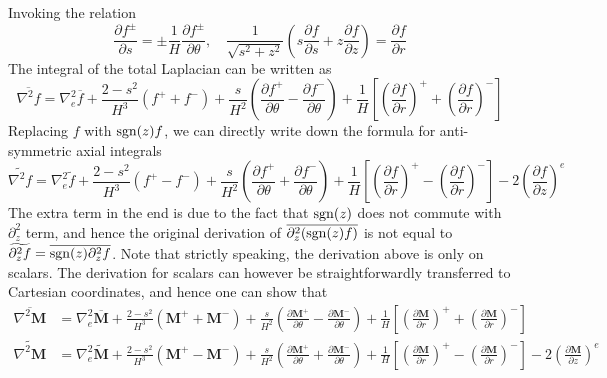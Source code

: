 Invoking the relation
\[
    \frac{\partial f^\pm}{\partial s} = \pm \frac{1}{H} \frac{\partial f^\pm}{\partial \theta},\quad 
    \frac{1}{\sqrt{s^2 + z^2}} \left(s \frac{\partial f}{\partial s} + z \frac{\partial f}{\partial z}\right) = \frac{\partial f}{\partial r}
\]
The integral of the total Laplacian can be written as
\begin{equation}
    \overline{\nabla^2 f} = \nabla_e^2 \overline{f} + \frac{2 - s^2}{H^3} \left(f^+ + f^-\right) + \frac{s}{H^2} \left(\frac{\partial f^+}{\partial \theta} - \frac{\partial f^-}{\partial \theta}\right) + \frac{1}{H} \left[\left(\frac{\partial f}{\partial r}\right)^+ + \left(\frac{\partial f}{\partial r}\right)^-\right]
\end{equation}
Replacing $f$ with $\operatorname{sgn}(z) f$, we can directly write down the formula for anti-symmetric axial integrals
\begin{equation}
    \widetilde{\nabla^2 f} = \nabla_e^2 \widetilde{f} + \frac{2 - s^2}{H^3} \left(f^+ - f^-\right) + \frac{s}{H^2} \left(\frac{\partial f^+}{\partial \theta} + \frac{\partial f^-}{\partial \theta}\right) + \frac{1}{H} \left[\left(\frac{\partial f}{\partial r}\right)^+ - \left(\frac{\partial f}{\partial r}\right)^-\right] - 2 \left(\frac{\partial f}{\partial z}\right)^e
\end{equation}
The extra term in the end is due to the fact that $\operatorname{sgn}(z)$ does not commute with $\partial_z^2$ term, and hence the original derivation of $\overline{\partial_z^2 (\operatorname{sgn}(z) f)}$ is not equal to $\widetilde{\partial_z^2 f} = \overline{\operatorname{sgn}(z) \partial_z^2 f}$. 
Note that strictly speaking, the derivation above is only on scalars. The derivation for scalars can however be straightforwardly transferred to Cartesian coordinates, and hence one can show that
\begin{equation}
\begin{aligned}
    \overline{\nabla^2 \mathbf{M}} &= \nabla_e^2 \overline{\mathbf{M}} + \frac{2 - s^2}{H^3} \left(\mathbf{M}^+ + \mathbf{M}^-\right) + \frac{s}{H^2} \left(\frac{\partial \mathbf{M}^+}{\partial \theta} - \frac{\partial \mathbf{M}^-}{\partial \theta}\right) + \frac{1}{H} \left[\left(\frac{\partial \mathbf{M}}{\partial r}\right)^+ + \left(\frac{\partial \mathbf{M}}{\partial r}\right)^-\right] \\
    \widetilde{\nabla^2 \mathbf{M}} &= \nabla_e^2 \widetilde{\mathbf{M}} + \frac{2 - s^2}{H^3} \left(\mathbf{M}^+ - \mathbf{M}^-\right) + \frac{s}{H^2} \left(\frac{\partial \mathbf{M}^+}{\partial \theta} + \frac{\partial \mathbf{M}^-}{\partial \theta}\right) + \frac{1}{H} \left[\left(\frac{\partial \mathbf{M}}{\partial r}\right)^+ - \left(\frac{\partial \mathbf{M}}{\partial r}\right)^-\right] - 2 \left(\frac{\partial \mathbf{M}}{\partial z}\right)^e
\end{aligned}
\end{equation}
